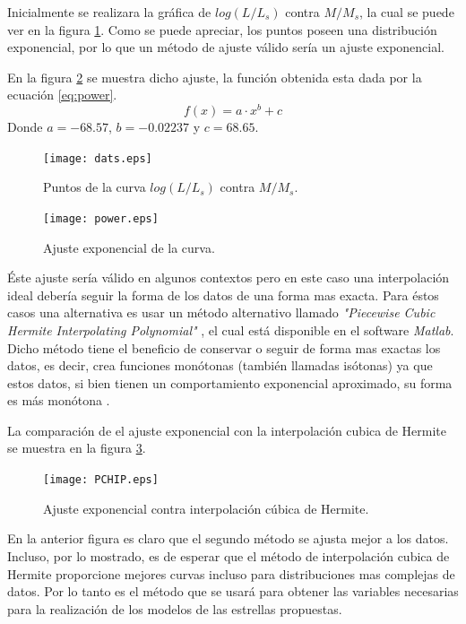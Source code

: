 \documentclass[12pt]{article}
\begin{document}
Inicialmente se realizara la gráfica de $log(L/L_s)$ contra $M/M_s$, la cual se puede ver en la figura \ref{fig:dats}. Como se puede apreciar, los puntos poseen una distribución exponencial, por lo que un método de ajuste válido sería un ajuste exponencial. 

En la figura \ref{fig:power} se muestra dicho ajuste, la función obtenida esta dada por la ecuación \ref{eq:power}.
\begin{equation}
 f(x) = a \cdot x^b+c
\label{eq:power}
\end{equation}
Donde $a = -68.57$, $b = -0.02237$ y $c = 68.65$.

\begin{figure}[H]
    \centering   
    \texttt{[image: dats.eps]}
    \caption{Puntos de la curva $log(L/L_s)$ contra $M/M_s$.}
    \label{fig:dats}
\end{figure}

\begin{figure}[H]
    \centering   
    \texttt{[image: power.eps]}
    \caption{Ajuste exponencial de la curva.}
    \label{fig:power}
\end{figure}

Éste ajuste sería válido en algunos contextos pero en este caso una interpolación ideal debería seguir la forma de los datos de una forma mas exacta. Para éstos casos una alternativa es usar un método alternativo llamado \textit{"Piecewise Cubic Hermite Interpolating Polynomial"} \cite{NM}, el cual está disponible en el software \textit{Matlab}. Dicho método tiene el beneficio de conservar o seguir de forma mas exactas los datos, es decir, crea funciones monótonas (también llamadas isótonas) ya que estos datos, si bien tienen un comportamiento exponencial aproximado, su forma es más monótona \cite{PCHIP}.

La comparación de el ajuste exponencial con la interpolación cubica de Hermite se muestra en la figura \ref{fig:PCHIP}.

\begin{figure}[H]
    \centering   
    \texttt{[image: PCHIP.eps]}
    \caption{Ajuste exponencial contra interpolación cúbica de Hermite.}
    \label{fig:PCHIP}
\end{figure}

En la anterior figura es claro que el segundo método se ajusta mejor a los datos. Incluso, por lo mostrado, es de esperar que el método de interpolación cubica de Hermite proporcione mejores curvas incluso para distribuciones mas complejas de datos.
Por lo tanto es el método que se usará para obtener las variables necesarias para la realización de los modelos de las estrellas propuestas.
\end{document}
